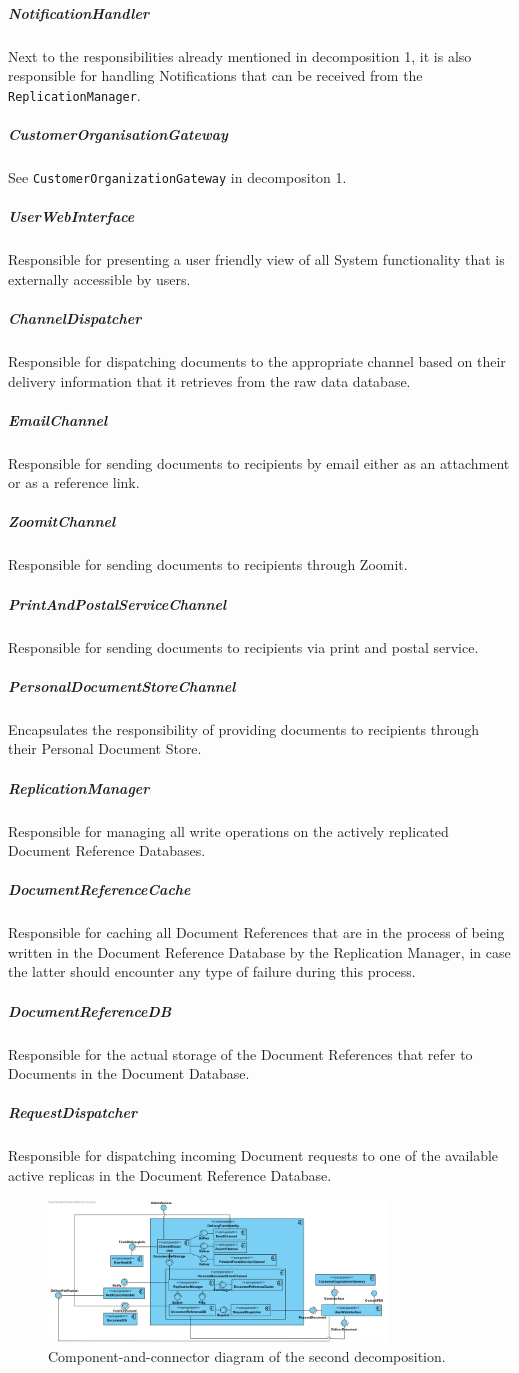 \documentclass[a4paper,10pt]{article}
\begin{document}
\subparagraph{NotificationHandler}
Next to the responsibilities already mentioned in decomposition 1, it is also responsible for handling Notifications that can be received from the \texttt{ReplicationManager}.

\subparagraph{CustomerOrganisationGateway}
See \texttt{CustomerOrganizationGateway} in decompositon 1.

\subparagraph{UserWebInterface}
Responsible for presenting a user friendly view of all System functionality that is externally accessible by users.

\subparagraph{ChannelDispatcher}
Responsible for dispatching documents to the appropriate channel based on their delivery information that it retrieves from the raw data database.

\subparagraph{EmailChannel}
Responsible for sending documents to recipients by email either as an attachment or as a reference link.

\subparagraph{ZoomitChannel}
Responsible for sending documents to recipients through Zoomit.

\subparagraph{PrintAndPostalServiceChannel}
Responsible for sending documents to recipients via print and postal service.

\subparagraph{PersonalDocumentStoreChannel}
Encapsulates the responsibility of providing documents to recipients through their Personal Document Store.

\subparagraph{ReplicationManager}
Responsible for managing all write operations on the actively replicated Document Reference Databases.

\subparagraph{DocumentReferenceCache}
Responsible for caching all Document References that are in the process of being written in the Document Reference Database by the Replication Manager, in case the latter should encounter any type of failure during this process.

\subparagraph{DocumentReferenceDB}
Responsible for the actual storage of the Document References that refer to Documents in the Document Database.

\subparagraph{RequestDispatcher}
Responsible for dispatching incoming Document requests to one of the available active replicas in the Document Reference Database.

\begin{figure}[!htp]
	\centering
	\includegraphics[width=0.8\textwidth]{DeliveryFunctionality.png}
	\caption{Component-and-connector diagram of the second decomposition.
	}\label{fig:compandcondecomp2}
\end{figure}
\end{document}
